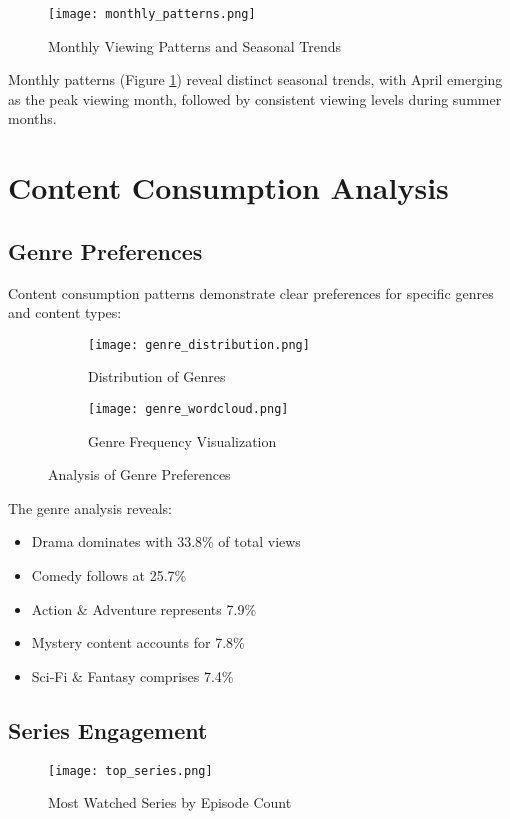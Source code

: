 \documentclass[12pt]{article}
\begin{document}
\begin{figure}[H]
\centering
\texttt{[image: monthly\_patterns.png]}
\caption{Monthly Viewing Patterns and Seasonal Trends}
\label{fig:monthly_patterns}
\end{figure}

Monthly patterns (Figure \ref{fig:monthly_patterns}) reveal distinct seasonal trends, with April emerging as the peak viewing month, followed by consistent viewing levels during summer months.

\section{Content Consumption Analysis}
\subsection{Genre Preferences}
Content consumption patterns demonstrate clear preferences for specific genres and content types:

\begin{figure}[H]
\centering
\begin{subfigure}{.48\textwidth}
\texttt{[image: genre\_distribution.png]}
\caption{Distribution of Genres}
\label{fig:genre_dist}
\end{subfigure}
\hfill
\begin{subfigure}{.48\textwidth}
\texttt{[image: genre\_wordcloud.png]}
\caption{Genre Frequency Visualization}
\label{fig:genre_cloud}
\end{subfigure}
\caption{Analysis of Genre Preferences}
\label{fig:genre_analysis}
\end{figure}

The genre analysis reveals:
\begin{itemize}
    \item Drama dominates with 33.8\% of total views
    \item Comedy follows at 25.7\%
    \item Action \& Adventure represents 7.9\%
    \item Mystery content accounts for 7.8\%
    \item Sci-Fi \& Fantasy comprises 7.4\%
\end{itemize}

\subsection{Series Engagement}
\begin{figure}[H]
\centering
\texttt{[image: top\_series.png]}
\caption{Most Watched Series by Episode Count}
\label{fig:top_series}
\end{figure}
\end{document}
